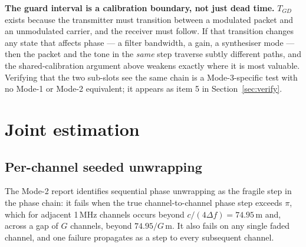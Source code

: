 \documentclass[11pt,a4paper]{article}
\newcommand{\Tgd}{T_{GD}}
\begin{document}
\begin{callout}
\textbf{The guard interval is a calibration boundary, not just dead time.} $\Tgd$ exists because the
transmitter must transition between a modulated packet and an unmodulated carrier, and the receiver
must follow. If that transition changes any state that affects phase --- a filter bandwidth, a gain,
a synthesiser mode --- then the packet and the tone in the \emph{same} step traverse subtly different
paths, and the shared-calibration argument above weakens exactly where it is most valuable. Verifying
that the two sub-slots see the same chain is a Mode-3-specific test with no Mode-1 or Mode-2
equivalent; it appears as item 5 in Section~\ref{sec:verify}.
\end{callout}

\section{Joint estimation}
\label{sec:joint}

\subsection{Per-channel seeded unwrapping}

The Mode-2 report identifies sequential phase unwrapping as the fragile step in the phase chain: it
fails when the true channel-to-channel phase step exceeds $\pi$, which for adjacent 1\,MHz channels
occurs beyond $c/(4\Delta f)=74.95$\,m and, across a gap of $G$ channels, beyond $74.95/G$\,m. It also
fails on any single faded channel, and one failure propagates as a step to every subsequent channel.
\end{document}
